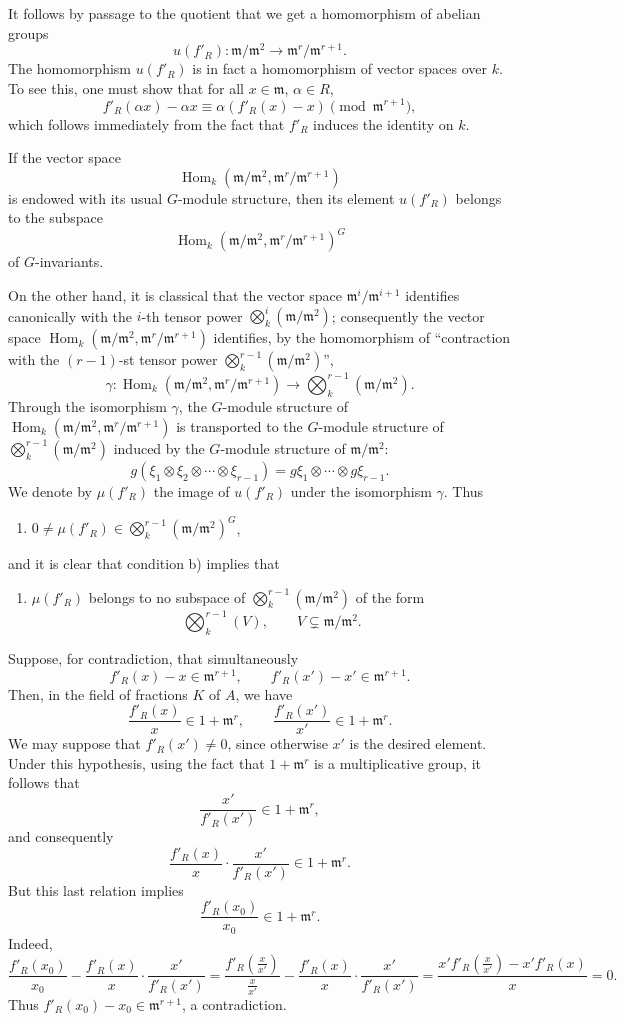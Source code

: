 \documentclass[11pt]{article}
\providecommand{\fm}{\mathfrak{m}}
\DeclareMathOperator{\Hom}{Hom}
\providecommand{\Hom}{\operatorname{Hom}}
\providecommand{\fm}{\mathfrak m}
\providecommand{\Hom}{\operatorname{Hom}}
\begin{document}
It follows by passage to the quotient that we get a homomorphism of abelian groups
\[
u(f'_R):\fm/\fm^2\longrightarrow \fm^r/\fm^{r+1}.
\]
The homomorphism $u(f'_R)$ is in fact a homomorphism of vector spaces over $k$. To see this, one must show that for all $x\in\fm$, $\alpha\in R$,
\[
f'_R(\alpha x)-\alpha x\equiv \alpha(f'_R(x)-x)\pmod{\fm^{r+1}},
\]
which follows immediately from the fact that $f'_R$ induces the identity on $k$.

If the vector space
\[
\Hom_k(\fm/\fm^2,\fm^r/\fm^{r+1})
\]
is endowed with its usual $G$-module structure, then its element $u(f'_R)$ belongs to the subspace
\[
\Hom_k(\fm/\fm^2,\fm^r/\fm^{r+1})^G
\]
of $G$-invariants.

On the other hand, it is classical that the vector space $\fm^i/\fm^{i+1}$ identifies canonically with the $i$-th tensor power $\bigotimes_k^i(\fm/\fm^2)$; consequently the vector space $\Hom_k(\fm/\fm^2,\fm^r/\fm^{r+1})$ identifies, by the homomorphism of ``contraction with the $(r-1)$-st tensor power $\bigotimes_k^{r-1}(\fm/\fm^2)$'',
\[
\gamma:\Hom_k(\fm/\fm^2,\fm^r/\fm^{r+1})
\longrightarrow \bigotimes_k^{r-1}(\fm/\fm^2).
\]
Through the isomorphism $\gamma$, the $G$-module structure of $\Hom_k(\fm/\fm^2,\fm^r/\fm^{r+1})$ is transported to the $G$-module structure of $\bigotimes_k^{r-1}(\fm/\fm^2)$ induced by the $G$-module structure of $\fm/\fm^2$:
\[
g(\xi_1\otimes\xi_2\otimes\cdots\otimes\xi_{r-1})=g\xi_1\otimes\cdots\otimes g\xi_{r-1}.
\]
We denote by $\mu(f'_R)$ the image of $u(f'_R)$ under the isomorphism $\gamma$. Thus
\begin{enumerate}
\item[1)] $0\ne\mu(f'_R)\in \bigotimes_k^{r-1}(\fm/\fm^2)^G$,
\end{enumerate}
and it is clear that condition b) implies that
\begin{enumerate}
\item[2)] $\mu(f'_R)$ belongs to no subspace of $\bigotimes_k^{r-1}(\fm/\fm^2)$ of the form
\[
\bigotimes_k^{r-1}(V),
\qquad V\subsetneq\fm/\fm^2.
\]
\end{enumerate}
Suppose, for contradiction, that simultaneously
\[
f'_R(x)-x\in\fm^{r+1},
\qquad
f'_R(x')-x'\in\fm^{r+1}.
\]
Then, in the field of fractions $K$ of $A$, we have
\[
\frac{f'_R(x)}{x}\in 1+\fm^r,
\qquad
\frac{f'_R(x')}{x'}\in 1+\fm^r.
\]
We may suppose that $f'_R(x')\ne0$, since otherwise $x'$ is the desired element. Under this hypothesis, using the fact that $1+\fm^r$ is a multiplicative group, it follows that
\[
\frac{x'}{f'_R(x')}\in 1+\fm^r,
\]
and consequently
\[
\frac{f'_R(x)}{x}\cdot \frac{x'}{f'_R(x')}\in 1+\fm^r.
\]
But this last relation implies
\[
\frac{f'_R(x_0)}{x_0}\in 1+\fm^r.
\]
Indeed,
\[
\frac{f'_R(x_0)}{x_0}-\frac{f'_R(x)}{x}\cdot\frac{x'}{f'_R(x')}
=
\frac{f'_R(\frac{x}{x'})}{\frac{x}{x'}}-
\frac{f'_R(x)}{x}\cdot\frac{x'}{f'_R(x')}
=
\frac{x'f'_R(\frac{x}{x'})-x'f'_R(x)}{x}=0.
\]
Thus $f'_R(x_0)-x_0\in\fm^{r+1}$, a contradiction.
\end{document}
